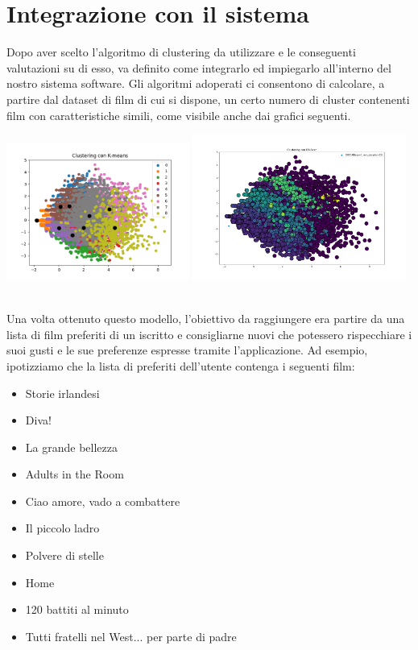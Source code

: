 \documentclass[a4paper, 10pt]{report}
\begin{document}
    \chapter{Integrazione con il sistema}\label{ch:integrazione-con-il-sistema}
        Dopo aver scelto l'algoritmo di clustering da utilizzare e le conseguenti valutazioni su di esso, va definito come
        integrarlo ed impiegarlo all'interno del nostro sistema software.
        Gli algoritmi adoperati ci consentono di calcolare, a partire dal dataset di film di cui si dispone, un certo numero di cluster
        contenenti film con caratteristiche simili, come visibile anche dai grafici seguenti.

        \begin{center}
            \includegraphics[width=6cm]{evaluation/k=9.png}
            \includegraphics[width=7cm]{evaluation/DBScan.png}
        \end{center}

        \\Una volta ottenuto questo modello, l'obiettivo da raggiungere era partire da una lista di film preferiti di un iscritto
        e consigliarne nuovi che potessero rispecchiare i suoi gusti e le sue preferenze espresse tramite l'applicazione.
        Ad esempio, ipotizziamo che la lista di preferiti dell'utente contenga i seguenti film:
        \begin{itemize}
            \item Storie irlandesi
            \item Diva!
            \item La grande bellezza
            \item Adults in the Room
            \item Ciao amore, vado a combattere
            \item Il piccolo ladro
            \item Polvere di stelle
            \item Home
            \item 120 battiti al minuto
            \item Tutti fratelli nel West... per parte di padre
        \end{itemize}
\end{document}
